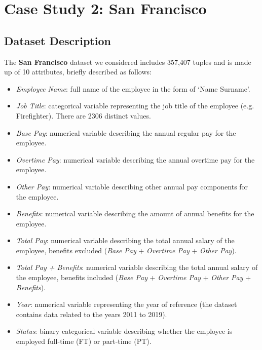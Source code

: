

\section{Case Study 2: San Francisco}
\subsection{Dataset Description}
The \textbf{San Francisco} dataset we considered includes 357,407 tuples and is made up of 10 attributes, briefly described as follows:
\begin{itemize}
\item \textit{Employee Name}: full name of the employee in the form of `Name Surname'.
\item \textit{Job Title}: categorical variable representing the job title of the employee (e.g. Firefighter). There are 2306 distinct values.
\item \textit{Base Pay}: numerical variable describing the annual regular pay for the employee.
\item \textit{Overtime Pay}: numerical variable describing the annual overtime pay for the employee.
\item \textit{Other Pay}: numerical variable describing other annual pay components for the employee.
\item \textit{Benefits}: numerical variable describing the amount of annual benefits for the employee.
\item \textit{Total Pay}: numerical variable describing the total annual salary of the employee, benefits excluded (\textit{Base Pay} + \textit{Overtime Pay} + \textit{Other Pay}).
\item \textit{Total Pay + Benefits}: numerical variable describing the total annual salary of the employee, benefits included (\textit{Base Pay} + \textit{Overtime Pay} + \textit{Other Pay} + \textit{Benefits}).
\item \textit{Year}: numerical variable representing the year of reference (the dataset contains data related to the years 2011 to 2019).
\item \textit{Status}: binary categorical variable describing whether the employee is employed full-time (FT) or part-time (PT).
\end{itemize}


